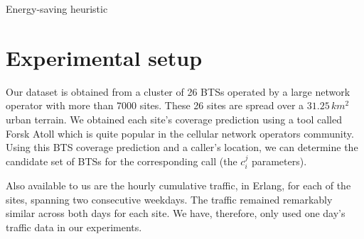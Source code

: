 \IncMargin{1em}
\LinesNumbered
\begin{algorithm}
\caption{Energy-saving heuristic}
\label{algo:heur1}
\end{algorithm}
\DecMargin{1em}

\section{Experimental setup}
Our dataset is obtained from a cluster of 26 BTSs operated by a large network operator with more than 7000 sites. These 26 sites are spread over a $31.25$\,$km^2$ urban terrain. We obtained each site's coverage prediction using a tool called Forsk Atoll which is quite popular in the cellular network operators community. Using this BTS coverage prediction and a caller's location, we can determine the candidate set of BTSs for the corresponding call (the $c_i^j$ parameters). 

Also available to us are the hourly cumulative traffic, in Erlang, for each of the sites, spanning two consecutive weekdays. The traffic remained remarkably similar across both days for each site. We have, therefore, only used one day's traffic data in our experiments.

